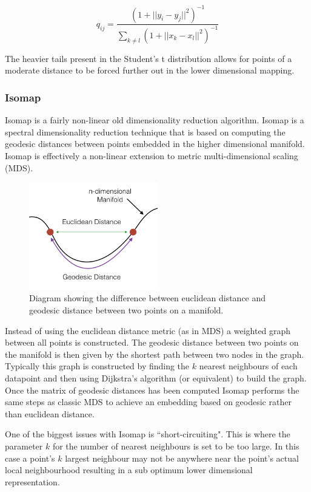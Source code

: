 \begin{equation}
	q_{ij} = \frac{(1 + ||y_i - y_j ||^2)^{-1}}{\sum_{k\neq l} (1 + ||x_k - x_l ||^2)^{-1}} 
\end{equation}

The heavier tails present in the Student's t distribution allows for points of a moderate distance to be forced further out in the lower dimensional mapping. 

\subsubsection{Isomap}
Isomap \cite{tenenbaum2000global} is a fairly non-linear old dimensionality reduction algorithm. Isomap is a spectral dimensionality reduction technique that is based on computing the geodesic distances between points embedded in the higher dimensional manifold. Isomap is effectively a non-linear extension to metric multi-dimensional scaling (MDS). 

\begin{figure}[H]
	\label{fig:manifold-distance}
	\centering
	\includegraphics[width=0.5\textwidth]{Images/manifold-distance.png}	
	\caption{Diagram showing the difference between euclidean distance and geodesic distance between two points on a manifold.}
\end{figure}

Instead of using the euclidean distance metric (as in MDS) a weighted graph between all points is constructed. The geodesic distance between two points on the manifold is then given by the shortest path between two nodes in the graph. Typically this graph is constructed by finding the $k$ nearest neighbours of each datapoint and then using Dijkstra’s algorithm (or equivalent) to build the graph. Once the matrix of geodesic distances has been computed Isomap performs the same steps as classic MDS to achieve an embedding based on geodesic rather than euclidean distance.

One of the biggest issues with Isomap is ``short-circuiting". This is where the parameter $k$ for the number of nearest neighbours is set to be too large. In this case a point's $k$ largest neighbour may not be anywhere near the point's actual local neighbourhood resulting in a sub optimum lower dimensional representation.

